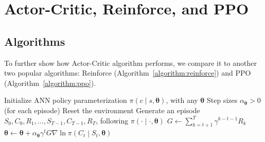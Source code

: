 \documentclass[balance,upint,subscriptcorrection,varvw,mathalfa=cal=boondoxo,pdf-a,colorlinks,nofoot]{asmeconf}
\begin{document}
\section{Actor-Critic, Reinforce, and PPO}
\subsection{Algorithms}
\noindent To further show how Actor-Critic algorithm performs, we compare it 
to another two popular algorithms: Reinforce 
(Algorithm~\ref{algorithm:reinforce}) and PPO (Algorithm~\ref{algorithm:ppo}).
\begin{algorithm}
    \caption{Reinforce for financial problem}\label{algorithm:reinforce}
    \begin{algorithmic}[1]
        \State Initialize ANN policy parameterization
        \(\pi\left(c\middle|s, \bm{\theta}\right)\), with any \(\bm{\theta}\)
        \State Step sizes \(\alpha_{\bm{\theta}}>0\)
        \Loop \hspace{0.3mm} (for each episode)
        \State Reset the environment
        \State Generate an episode 
        \(S_0, C_0, R_1, ..., S_{T-1}, C_{T-1}, R_T\),
        following \(\pi\left(\cdot\middle|\cdot, \bm{\theta}\right)\)
        \State \(G \gets \sum_{k=t+1}^{T} \gamma^{k-t-1}R_k\)
        \State \(\bm{\theta} \gets \bm{\theta} + \alpha_{\bm{\theta}}\gamma^t
        G\nabla{\ln{\pi\left(C_t\middle|S_t, \bm{\theta}\right)}}\)
        \EndFor
        \EndLoop
    \end{algorithmic}
\end{algorithm}
\end{document}
